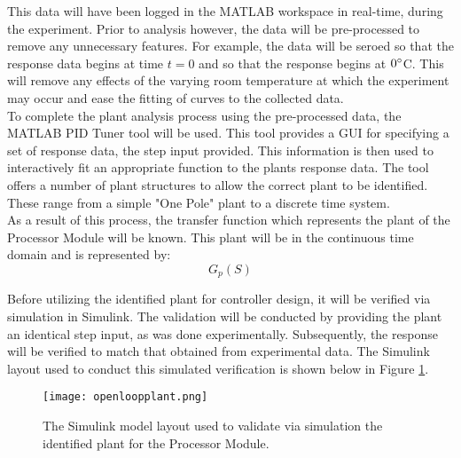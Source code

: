 This data will have been logged in the MATLAB workspace in real-time, during the experiment. Prior to analysis however, the data will be pre-processed to remove any unnecessary features. For example, the data will be seroed so that the response data begins at time $t = 0$ and so that the response begins at $0\degree$C. This will remove any effects of the varying room temperature at which the experiment may occur and ease the fitting of curves to the collected data.\\

To complete the plant analysis process using the pre-processed data, the MATLAB PID Tuner tool will be used. This tool provides a GUI for specifying a set of response data, the step input provided. This information is then used to interactively fit an appropriate function to the plants response data. The tool offers a number of plant structures to allow the correct plant to be identified. These range from a simple "One Pole" plant to a discrete time system.\\

As a result of this process, the transfer function which represents the plant of the Processor Module will be known. This plant will be in the continuous time domain and is represented by:
$$G_p(S)$$

Before utilizing the identified plant for controller design, it will be verified via simulation in Simulink. The validation will be conducted by providing the plant an identical step input, as was done experimentally. Subsequently, the response will be verified to match that obtained from experimental data. The Simulink layout used to conduct this simulated verification is shown below in Figure \ref{fig:openloopplant}.\\

\begin{figure}[!htb]
	\centering
	\texttt{[image: openloopplant.png]}
	\caption[Open loop plant valiation Simulink Model.]{The Simulink model layout used to validate via simulation the identified plant for the Processor Module.}
	\label{fig:openloopplant}
\end{figure} 
\FloatBarrier

